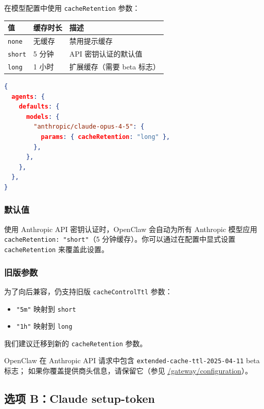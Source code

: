 在模型配置中使用 \texttt{cacheRetention} 参数：


\begin{table}[h]
\centering
\small
\begin{tabular}{|l|l|l|}
\hline
值 & 缓存时长 & 描述 \\
\hline
\texttt{none} & 无缓存 & 禁用提示缓存 \\
\hline
\texttt{short} & 5 分钟 & API 密钥认证的默认值 \\
\hline
\texttt{long} & 1 小时 & 扩展缓存（需要 beta 标志） \\
\hline
\end{tabular}
\end{table}



\begin{lstlisting}[language=json]
{
  agents: {
    defaults: {
      models: {
        "anthropic/claude-opus-4-5": {
          params: { cacheRetention: "long" },
        },
      },
    },
  },
}
\end{lstlisting}


\subsubsection{默认值}


使用 Anthropic API 密钥认证时，OpenClaw 会自动为所有 Anthropic 模型应用 \texttt{cacheRetention: "short"}（5 分钟缓存）。你可以通过在配置中显式设置 \texttt{cacheRetention} 来覆盖此设置。

\subsubsection{旧版参数}


为了向后兼容，仍支持旧版 \texttt{cacheControlTtl} 参数：

\begin{itemize}
  \item \texttt{"5m"} 映射到 \texttt{short}
  \item \texttt{"1h"} 映射到 \texttt{long}
\end{itemize}


我们建议迁移到新的 \texttt{cacheRetention} 参数。

OpenClaw 在 Anthropic API 请求中包含 \texttt{extended-cache-ttl-2025-04-11} beta 标志；
如果你覆盖提供商头信息，请保留它（参见 \href{/gateway/configuration}{/gateway/configuration}）。

\subsection{选项 B：Claude setup-token}


